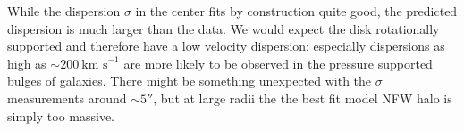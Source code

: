 While the dispersion $\sigma$ in the center fits by construction quite good, the predicted dispersion is much larger than the data. We would expect the disk rotationally supported and therefore have a low velocity dispersion; especially dispersions as high as $\sim 200~\text{km s}^{-1}$ are more likely to be observed in the pressure supported bulges of galaxies. There might be something unexpected with the $\sigma$ measurements around $\sim 5''$, but at large radii the the best fit model NFW halo is simply too massive. 
